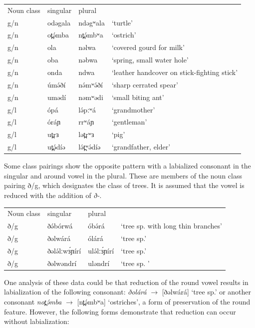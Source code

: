 \ea
\begin{tabular}[t]{llll}
	Noun class	&	singular		&	plural\\
	g/n	&	odəgala	&	ndəgʷala&		‘turtle’\\
	g/n	&	ot̪ə́mba	&	nt̪ə́mbʷa	&	‘ostrich’\\
	g/n	&	ola		&	nəlwa	&	‘covered gourd for milk’\\
	g/n	&	oba		&	nəbwa	&	‘spring, small water hole’\\
	g/n	&	onda	&	ndwa		&	‘leather handcover on stick-fighting stick’  \\
	g/n	&	úmə́ðí	&	nə́mʷə́ðí	&	‘sharp cerrated spear’\\
	g/n	&	umədí	&	nəmʷədi	&	‘small biting ant’\\
	g/l	&	ópá		&	lə́pːʷá	&	‘grandmother’\\
	g/l	&	óráɲ	&	rrʷáɲ	&	‘gentleman’\\
	g/l	&	ut̪rɜ 	&	lət̪rʷɜ	&	‘pig’\\
	g/l	&	ut̪ə́díə	&	lə́t̪ʷə́díə	&	‘grandfather, elder’\\
\end{tabular}
\z

Some class pairings show the opposite pattern with a labialized consonant in the singular and around vowel in the plural. These are members of the noun class pairing ð/g, which designates the class of trees. It is assumed that the vowel is reduced with the addition of \textit{ð-}. 

\ea
\begin{tabular}[t]{llll}
Noun class	&	singular		&	plural\\
ð/g	&	ðə́bórwá		&	óbə́rá		&	‘tree sp. with long thin branches’\\
ð/g	&	ðəlwárá		&	ólárá	&	‘tree sp.’\\
ð/g	&	ðələ́lːwɜ́ɲírí	&	ulə́lːɜ́ɲírí	&	‘tree sp.’\\
ð/g	&	ðəlwəndrí	&	uləndrí	&	‘tree sp. ’\\
\end{tabular}
\z

One analysis of these data could be that reduction of the round vowel results in labialization of the following consonant: \textit{ðolárá} $\rightarrow$ [ðəlwárá] ‘tree sp.’ or another consonant \textit{not̪ə́mba} $\rightarrow$ [nt̪ə́mbʷa] ‘ostriches’, a form of preservation of the round feature. However, the following forms demonstrate that reduction can occur without labialization:

